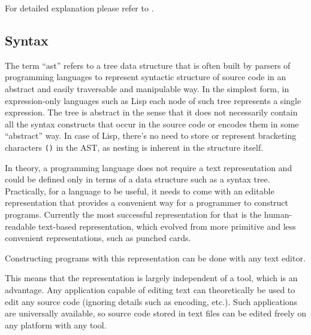 
For detailed explanation please refer to \cite{sicp_meta}.

\subsection{Syntax}
The term ``\acrlong{ast}'' refers to a tree data structure that is often  built
by parsers of programming languages to represent syntactic structure of source
code in an abstract and easily traversable and manipulable way. In the simplest
form, in expression-only languages such as Lisp each node of such tree
represents a single expression. The tree is abstract in the sense that it does
not necessarily contain all the syntax constructs that occur in the source code
or encodes them in some ``abstract'' way. In case of Lisp, there's no need to
store or represent bracketing characters \texttt{()} in the AST, as nesting is
inherent in the structure itself.

In theory, a programming language does not require a text representation and
could be defined only in terms of a data structure such as a syntax
tree. Practically, for a language to be useful, it needs to come with an
editable representation that provides a convenient way for a programmer to
construct programs. Currently the most successful representation for that is the
human-readable text-based representation, which evolved from more primitive and
less convenient representations, such as punched cards.

Constructing programs with this  representation can be done with any text editor.

This means that the representation is largely independent of a tool, which is an
advantage. Any application capable of editing text can theoretically be used to
edit any source code (ignoring details such as encoding, etc.). Such
applications are universally available, so source code stored in text files can
be edited freely on any platform with any tool.

